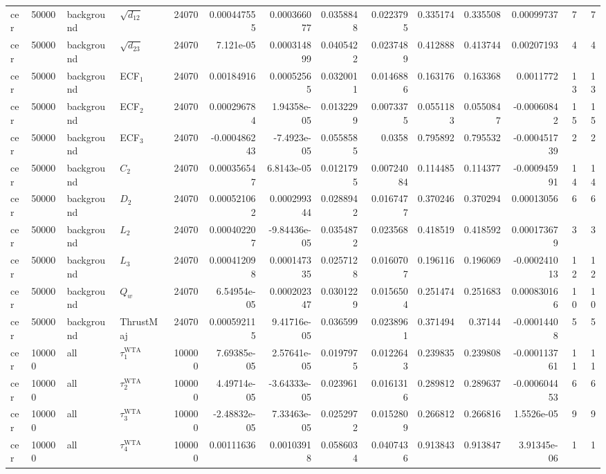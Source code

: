 \begin{landscape}
\begin{longtable}{llll r rrrr rr r rr}
cer & 50000 & background & $\sqrt{d_{12}}$ & 24070 & 0.000447555 & 0.000366077 & 0.0358848 & 0.0223795 & 0.335174 & 0.335508 & 0.00099737 & 7 & 7 \\
cer & 50000 & background & $\sqrt{d_{23}}$ & 24070 & 7.121e-05 & 0.000314899 & 0.0405422 & 0.0237489 & 0.412888 & 0.413744 & 0.00207193 & 4 & 4 \\
cer & 50000 & background & ECF$_1$ & 24070 & 0.00184916 & 0.00052565 & 0.0320011 & 0.0146886 & 0.163176 & 0.163368 & 0.0011772 & 13 & 13 \\
cer & 50000 & background & ECF$_2$ & 24070 & 0.000296784 & 1.94358e-05 & 0.0132299 & 0.0073375 & 0.0551183 & 0.0550847 & -0.00060842 & 15 & 15 \\
cer & 50000 & background & ECF$_3$ & 24070 & -0.000486243 & -7.4923e-05 & 0.0558585 & 0.0358 & 0.795892 & 0.795532 & -0.000451739 & 2 & 2 \\
cer & 50000 & background & $C_2$ & 24070 & 0.000356547 & 6.8143e-05 & 0.0121795 & 0.00724084 & 0.114485 & 0.114377 & -0.000945991 & 14 & 14 \\
cer & 50000 & background & $D_2$ & 24070 & 0.000521062 & 0.000299344 & 0.0288942 & 0.0167477 & 0.370246 & 0.370294 & 0.00013056 & 6 & 6 \\
cer & 50000 & background & $L_2$ & 24070 & 0.000402207 & -9.84436e-05 & 0.0354872 & 0.023568 & 0.418519 & 0.418592 & 0.000173679 & 3 & 3 \\
cer & 50000 & background & $L_3$ & 24070 & 0.000412098 & 0.000147335 & 0.0257128 & 0.0160707 & 0.196116 & 0.196069 & -0.000241013 & 12 & 12 \\
cer & 50000 & background & $Q_w$ & 24070 & 6.54954e-05 & 0.000202347 & 0.0301229 & 0.0156504 & 0.251474 & 0.251683 & 0.000830166 & 10 & 10 \\
cer & 50000 & background & ThrustMaj & 24070 & 0.000592115 & 9.41716e-05 & 0.036599 & 0.0238961 & 0.371494 & 0.37144 & -0.00014408 & 5 & 5 \\
cer & 100000 & all & $\tau_1^{\mathrm{WTA}}$ & 100000 & 7.69385e-05 & 2.57641e-05 & 0.0197975 & 0.0122643 & 0.239835 & 0.239808 & -0.000113761 & 11 & 11 \\
cer & 100000 & all & $\tau_2^{\mathrm{WTA}}$ & 100000 & 4.49714e-05 & -3.64333e-05 & 0.023961 & 0.0161316 & 0.289812 & 0.289637 & -0.000604453 & 6 & 6 \\
cer & 100000 & all & $\tau_3^{\mathrm{WTA}}$ & 100000 & -2.48832e-05 & 7.33463e-05 & 0.0252972 & 0.0152809 & 0.266812 & 0.266816 & 1.5526e-05 & 9 & 9 \\
cer & 100000 & all & $\tau_4^{\mathrm{WTA}}$ & 100000 & 0.00111636 & 0.00103918 & 0.0586034 & 0.0407436 & 0.913843 & 0.913847 & 3.91345e-06 & 1 & 1 \\

\end{longtable}
\end{landscape}
